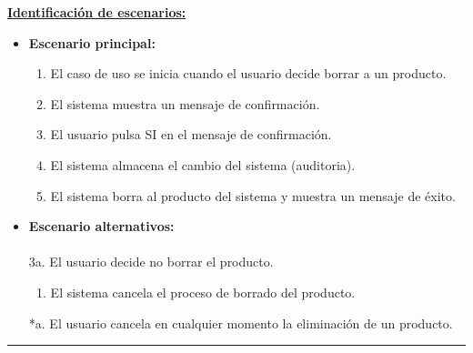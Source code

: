 \underline{\textbf{Identificación de escenarios:}}
\begin{itemize}\renewcommand{\labelitemi}{$\circ$}
 \item \textbf{Escenario principal:}
         \begin{enumerate}
          \item El caso de uso se inicia cuando el usuario decide borrar a un producto.
          \item El sistema muestra un mensaje de confirmación.
          \item El usuario pulsa SI en el mensaje de confirmación.
 	  \item El sistema almacena el cambio del sistema (auditoria).
	  \item El sistema borra al producto del sistema y muestra un mensaje de éxito.
         \end{enumerate}
  \item \textbf{Escenario alternativos:}\\\\
           3a. El usuario decide no borrar el producto.
		\begin{enumerate}
		 \item El sistema cancela el proceso de borrado del producto.
		\end{enumerate}
          *a. El usuario cancela en cualquier momento la eliminación de un producto.
\end{itemize}
\smallskip
\hrule height 1pt
\smallskip

